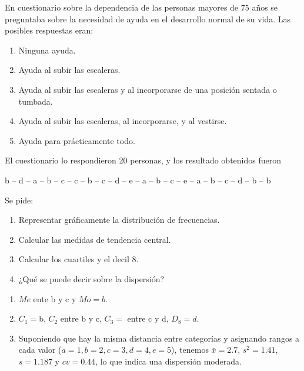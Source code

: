 {En cuestionario sobre la dependencia de las personas mayores de 75 años se preguntaba sobre la necesidad de ayuda en el desarrollo normal de su vida. Las posibles respuestas eran:
\begin{enumerate}
\item Ninguna ayuda.
\item Ayuda al subir las escaleras.
\item Ayuda al subir las escaleras y al incorporarse de una posición sentada o tumbada.
\item Ayuda al subir las escaleras, al incorporarse, y al vestirse.
\item Ayuda para prácticamente todo.
\end{enumerate}
El cuestionario lo respondieron 20 personas, y los resultado obtenidos fueron
\begin{center}
b -- d -- a -- b -- c -- c -- b -- c -- d -- e -- a -- b -- c -- e -- a -- b -- c -- d -- b -- b
\end{center}
Se pide:
\begin{enumerate}
\item Representar gráficamente la distribución de frecuencias.
\item Calcular las medidas de tendencia central.
\item Calcular los cuartiles y el decil 8.
\item ¿Qué se puede decir sobre la dispersión?
\end{enumerate}
}
{\begin{enumerate}[start=2]
\item $Me$ ente b y c y $Mo=b$. 
\item $C_1=$b, $C_2$ entre b y c, $C_3=$ entre c y d, $D_8=d$.
\item Suponiendo que hay la misma distancia entre categorías y asignando rangos a cada valor ($a=1,b=2,c=3,d=4,e=5$), tenemos $\bar x=2.7$, $s^2=1.41$, $s=1.187$ y $cv=0.44$, lo que indica una dispersión moderada. 
\end{enumerate}
}
{}


